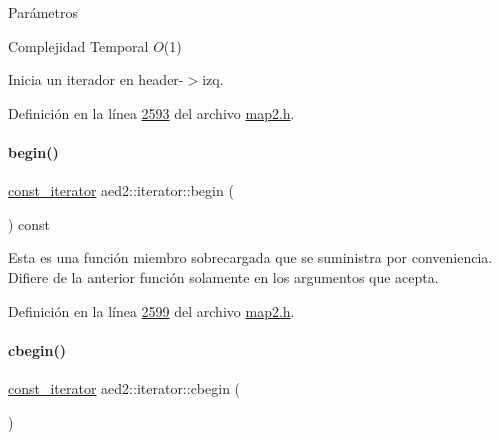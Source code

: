 \begin{DoxyParams}{\-Parámetros}
\begin{DoxyCompactItemize}
\begin{DoxyDescription}
\item[Complejidad Temporal]$O$(1)
\end{DoxyDescription}Inicia un iterador en header-\/$>$izq. 

Definición en la línea \hyperlink{map2_8h_source_l02593}{2593} del archivo \hyperlink{map2_8h_source}{map2.\+h}.

\mbox{\label{classaed2_1_1iterator_a8a5783a3ab356cd6247b98d302d9130c_a8a5783a3ab356cd6247b98d302d9130c}} 
\paragraph{\texorpdfstring{begin()}{begin()}\hspace{0.1cm}{\footnotesize\ttfamily [2/2]}}
{\footnotesize\ttfamily \hyperlink{classaed2_1_1iterator_1_1const__iterator}{const\+\_\+iterator} aed2\+::iterator\+::begin (\begin{DoxyParamCaption}{ }\end{DoxyParamCaption}) const\hspace{0.3cm}{\ttfamily [inline]}}

Esta es una función miembro sobrecargada que se suministra por conveniencia. Difiere de la anterior función solamente en los argumentos que acepta. 

Definición en la línea \hyperlink{map2_8h_source_l02599}{2599} del archivo \hyperlink{map2_8h_source}{map2.\+h}.

\mbox{\label{classaed2_1_1iterator_a89cca73bd2e4df39de7c412c441d6da1_a89cca73bd2e4df39de7c412c441d6da1}} 
\paragraph{\texorpdfstring{cbegin()}{cbegin()}}
{\footnotesize\ttfamily \hyperlink{classaed2_1_1iterator_1_1const__iterator}{const\+\_\+iterator} aed2\+::iterator\+::cbegin (\begin{DoxyParamCaption}{ }\end{DoxyParamCaption})\hspace{0.3cm}{\ttfamily [inline]}}


\end{DoxyCompactItemize}
\end{DoxyParams}
